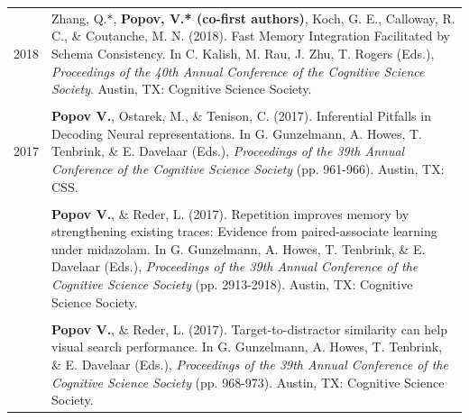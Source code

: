 \documentclass[letterpaper]{article}
\begin{document}
\begin{longtable}{p{0.7cm}p{15cm}}
  2018 & Zhang, Q.*, \textbf{Popov, V.* (co-first authors)}, Koch, G. E., Calloway, R. C., \& Coutanche, M. N. (2018). Fast Memory Integration Facilitated by Schema Consistency. In C. Kalish, M. Rau, J. Zhu, T. Rogers (Eds.), {\it Proceedings of the 40th Annual Conference of the Cognitive Science Society}. Austin, TX: Cognitive Science Society.                               \\[6pt]
  &                                                                                                                                                                                                                                                                                                                                                                        \\
  2017 & \textbf{Popov V.}, Ostarek, M., \& Tenison, C. (2017). Inferential Pitfalls in Decoding Neural representations. In G. Gunzelmann, A. Howes, T. Tenbrink, \& E. Davelaar (Eds.), {\it Proceedings of the 39th Annual Conference of the Cognitive Science Society} (pp. 961-966). Austin, TX: CSS.                                                                       \\[6pt]
  &                                                                                                                                                                                                                                                                                                                                                                        \\
  & \textbf{Popov V.}, \& Reder, L. (2017). Repetition improves memory by strengthening existing traces: Evidence from paired-associate learning under midazolam. In G. Gunzelmann, A. Howes, T. Tenbrink, \& E. Davelaar (Eds.), {\it Proceedings of the 39th Annual Conference of the Cognitive Science Society} (pp. 2913-2918). Austin, TX: Cognitive Science Society. \\[6pt]
  &                                                                                                                                                                                                                                                                                                                                                                        \\
  & \textbf{Popov V.}, \& Reder, L. (2017). Target-to-distractor similarity can help visual search performance. In G. Gunzelmann, A. Howes, T. Tenbrink, \& E. Davelaar (Eds.), {\it Proceedings of the 39th Annual Conference of the Cognitive Science Society} (pp. 968-973). Austin, TX: Cognitive Science Society.                                                     \\[6pt]

\end{longtable}
\end{document}
